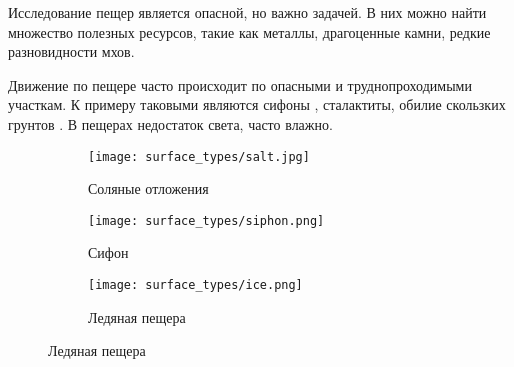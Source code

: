 
{\actuality} Исследование пещер является опасной, но важно задачей. В них можно найти множество полезных ресурсов, такие как металлы, драгоценные камни, редкие разновидности мхов.

Движение по пещере часто происходит по опасными и труднопроходимыми участкам. К примеру таковыми являются сифоны , сталактиты, обилие скользких грунтов . В пещерах недостаток света, часто влажно.

\begin{figure}[ht]
  \begin{subfigure}[b]{0.3\textwidth}
      \centering\texttt{[image: surface\_types/salt.jpg]}\\
      \caption{Соляные отложения}
      \label{fig:surface_types/salt}
  \end{subfigure}
  \hfill
  \begin{subfigure}[b]{0.3\textwidth}
      \centering\texttt{[image: surface\_types/siphon.png]}\\
      \caption{Сифон}
      \label{fig:surface_types/siphon}
  \end{subfigure}
  \hfill
  \begin{subfigure}[b]{0.3\textwidth}
      \centering\texttt{[image: surface\_types/ice.png]}\\
      \caption{Ледяная пещера}
      \label{fig:surface_types/ice}
  \end{subfigure}


\end{figure}
